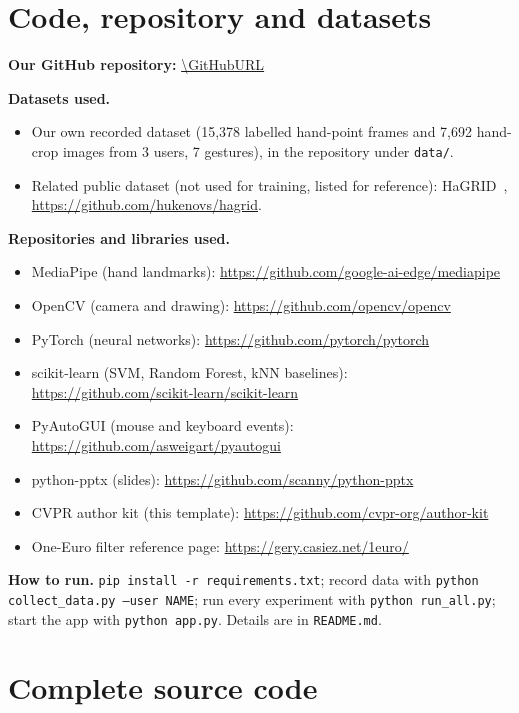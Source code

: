 \section{Code, repository and datasets}
\label{sec:appendix}

\noindent\textbf{Our GitHub repository:} \url{\GitHubURL}

\medskip
\noindent\textbf{Datasets used.}
\begin{itemize}
\item Our own recorded dataset (15,378 labelled hand-point frames and 7,692
hand-crop images from 3 users, 7 gestures), in the repository under
\texttt{data/}.
\item Related public dataset (not used for training, listed for reference):
HaGRID~\cite{kapitanov2024hagrid}, \url{https://github.com/hukenovs/hagrid}.
\end{itemize}

\noindent\textbf{Repositories and libraries used.}
\begin{itemize}
\item MediaPipe (hand landmarks): \url{https://github.com/google-ai-edge/mediapipe}
\item OpenCV (camera and drawing): \url{https://github.com/opencv/opencv}
\item PyTorch (neural networks): \url{https://github.com/pytorch/pytorch}
\item scikit-learn (SVM, Random Forest, kNN baselines): \url{https://github.com/scikit-learn/scikit-learn}
\item PyAutoGUI (mouse and keyboard events): \url{https://github.com/asweigart/pyautogui}
\item python-pptx (slides): \url{https://github.com/scanny/python-pptx}
\item CVPR author kit (this template): \url{https://github.com/cvpr-org/author-kit}
\item One-Euro filter reference page: \url{https://gery.casiez.net/1euro/}
\end{itemize}

\noindent\textbf{How to run.} \texttt{pip install -r requirements.txt};
record data with \texttt{python collect\_data.py --user NAME}; run every
experiment with \texttt{python run\_all.py}; start the app with
\texttt{python app.py}. Details are in \texttt{README.md}.

\section{Complete source code}

